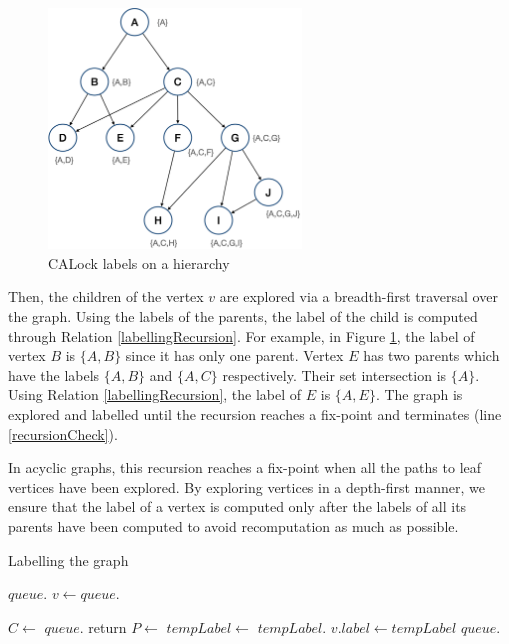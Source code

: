 \begin{figure}[h]
	\centering
	\captionsetup{justification=centering}
	\includegraphics[width=0.6\textwidth]{figures/CALockExample.png}
	\caption{CALock labels on a hierarchy}
	\label{fig:calockexample}
\end{figure}

Then, the children of the vertex $v$ are explored via a breadth-first traversal over the graph. Using the labels of the parents, the label of the child is computed through Relation \ref{labellingRecursion}. For example, in Figure \ref{fig:calockexample}, the label of vertex $B$ is $\{A, B\}$ since it has only one parent. Vertex $E$ has two parents which have the labels $\{A, B\}$ and $\{A, C\}$ respectively. Their set intersection is $\{A\}$. Using Relation \ref{labellingRecursion}, the label of $E$ is $\{A, E\}$. The graph is explored and labelled until the recursion reaches a fix-point and terminates (line \ref{recursionCheck}). 

In acyclic graphs, this recursion reaches a fix-point when all the paths to leaf vertices have been explored. By exploring vertices in a depth-first manner, we ensure that the label of a vertex is computed only after the labels of all its parents have been computed to avoid recomputation as much as possible.


\begin{algorithm}[h]
	\caption{Labelling the graph}
	\begin{algorithmic}[1]
		\State $queue$.
		\State $v\gets queue.$
		\State {}
		\EndWhile
		\EndProcedure
		\Statex

		\State $C\gets$
		 \label{rootLabellingBegin}
		\State $queue.$
		\State return
		\EndIf\label{rootLabellingEnd}
		\State $P\gets$\label{labellingRelationImplBegin}
		\State $tempLabel\gets$\label{intersectionStart}
		\State $tempLabel$. \label{intersectionEnd}
		 \label{recursionCheck}
		\State $v.label\gets tempLabel$
		\State $queue.$
		\EndIf \label{labellingRelationImplEnd}
		\EndProcedure
	\end{algorithmic}
	\label{labelAssignment}
\end{algorithm}


